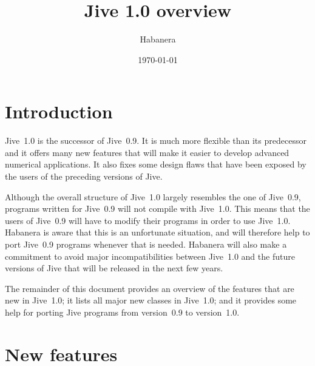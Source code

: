 \documentclass[a4paper,11pt]{article}
\title{ Jive 1.0 overview }
\author{ Habanera }
\date{ \today }
\begin{document}
\maketitle


\section{Introduction}

Jive~1.0 is the successor of Jive~0.9. It is much more flexible than
its predecessor and it offers many new features that will make it
easier to develop advanced numerical applications. It also fixes some
design flaws that have been exposed by the users of the preceding
versions of Jive.

Although the overall structure of Jive~1.0 largely resembles the one
of Jive~0.9, programs written for Jive~0.9 will not compile with
Jive~1.0. This means that the users of Jive~0.9 will have to modify
their programs in order to use Jive~1.0. Habanera is aware that this
is an unfortunate situation, and will therefore help to port Jive~0.9
programs whenever that is needed. Habanera will also make a commitment
to avoid major incompatibilities between Jive~1.0 and the future
versions of Jive that will be released in the next few years.

The remainder of this document provides an overview of the features
that are new in Jive~1.0; it lists all major new classes in Jive~1.0;
and it provides some help for porting Jive programs from version~0.9
to version~1.0.



\section{New features}
\end{document}
